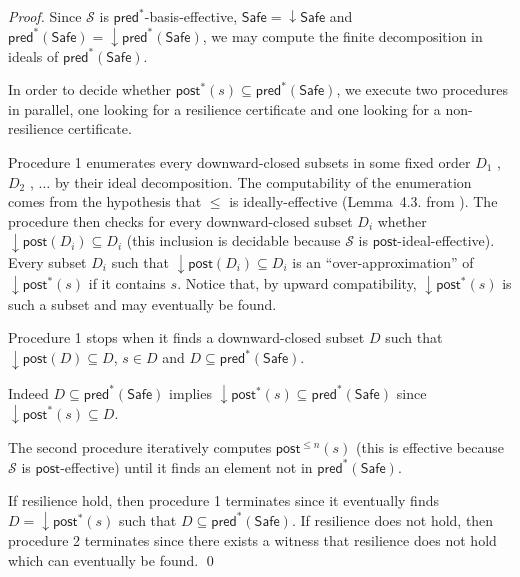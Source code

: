 \documentclass[runningheads]{llncs}
\newcommand{\alain}[1]{\todo[inline,color=red!20]{{\bf AF:} #1}}
\newcommand{\mathieu}[1]{\todo[inline,color=blue!20]{{\bf MH:} #1}}
\newcommand{\pred}{\textsf{pred}}
\newcommand{\post}{\textsf{post}}
\newcommand{\Safe}{\textsf{Safe}}
\begin{document}
\begin{proof}
Since $\mathscr{S}$ is $\pred^*$-basis-effective, $\Safe = \mathop{\downarrow} \Safe$ and $\pred^*(\Safe)=\mathop{\downarrow} \pred^*(\Safe)$, we may compute the finite decomposition in ideals of $\pred^*(\Safe)$.

In order to decide whether %
$\post^{ *}(s)  
 \subseteq \pred^*(\Safe)$, we execute two procedures in parallel,
one looking for a resilience certificate and one looking for a non-resilience certificate.

Procedure 1 enumerates every downward-closed subsets in some fixed order $D_1$ , $D_2$ , $\ldots$ by their ideal decomposition. The computability of the enumeration comes from the hypothesis that $\leq$ is ideally-effective (Lemma~4.3. from \cite{DBLP:journals/lmcs/BlondinFM17}).
The procedure then checks for every downward-closed subset $D_i$ whether $\mathop{\downarrow} \post(D_i) \subseteq D_i$ (this inclusion is decidable because $\mathscr{S}$ is $\post$-ideal-effective). 
Every subset $D_i$ such that $\mathop{\downarrow} \post(D_i) \subseteq D_i$ is an “over-approximation” of $\mathop{\downarrow} \post^*(s)$ if it contains $s$.
Notice that, by 
upward compatibility, $\mathop{\downarrow} \post^*(s)$ is such a subset and may eventually be found.

Procedure 1 stops when it finds a downward-closed subset $D$ such that
$\mathop{\downarrow} \post(D) \subseteq D$,
$s \in D$ and
$D   \subseteq \pred^*(\Safe)$. 

Indeed
$D \subseteq  \pred^*(\Safe)$ implies
$\mathop{\downarrow} \post^*(s)  \subseteq  \pred^*(\Safe)$
since $ \mathop{\downarrow} \post^*(s)  \subseteq D$.

The second procedure iteratively computes
$\post^{\leq n}(s) $ (this is effective because $\mathscr{S}$ is $\post$-effective)
until it finds an element
not in $\pred^*(\Safe)$.

If resilience hold, then procedure 1 terminates since it eventually finds
 $D = \mathop{\downarrow} \post^*(s)$ 
 such that  $D \subseteq  \pred^*(\Safe)$.
 If resilience does not hold, then procedure 2 terminates since
there exists a witness that resilience does not hold which can eventually be found. \qed
\end{proof}
\end{document}
